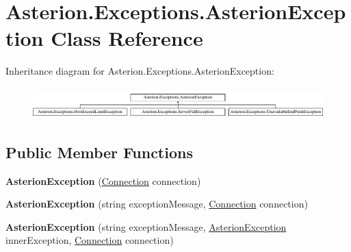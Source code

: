 \hypertarget{classAsterion_1_1Exceptions_1_1AsterionException}{\section{Asterion.\-Exceptions.\-Asterion\-Exception Class Reference}
\label{classAsterion_1_1Exceptions_1_1AsterionException}
}
Inheritance diagram for Asterion.\-Exceptions.\-Asterion\-Exception\-:\begin{figure}[H]
\begin{center}
\leavevmode
\includegraphics[height=1.216069cm]{classAsterion_1_1Exceptions_1_1AsterionException}
\end{center}
\end{figure}
\subsection*{Public Member Functions}
\begin{DoxyCompactItemize}
\item 
\hypertarget{classAsterion_1_1Exceptions_1_1AsterionException_ab85cb9471b143b1e5326c3f62bc36e8c}{{\bfseries Asterion\-Exception} (\hyperlink{classAsterion_1_1Connection}{Connection} connection)}\label{classAsterion_1_1Exceptions_1_1AsterionException_ab85cb9471b143b1e5326c3f62bc36e8c}

\item 
\hypertarget{classAsterion_1_1Exceptions_1_1AsterionException_ad392955ec1ed931744744c307fd8a8ba}{{\bfseries Asterion\-Exception} (string exception\-Message, \hyperlink{classAsterion_1_1Connection}{Connection} connection)}\label{classAsterion_1_1Exceptions_1_1AsterionException_ad392955ec1ed931744744c307fd8a8ba}

\item 
\hypertarget{classAsterion_1_1Exceptions_1_1AsterionException_aa7ac9d85342d7a9dda762e9d5176ed75}{{\bfseries Asterion\-Exception} (string exception\-Message, \hyperlink{classAsterion_1_1Exceptions_1_1AsterionException}{Asterion\-Exception} inner\-Exception, \hyperlink{classAsterion_1_1Connection}{Connection} connection)}\label{classAsterion_1_1Exceptions_1_1AsterionException_aa7ac9d85342d7a9dda762e9d5176ed75}

\end{DoxyCompactItemize}
